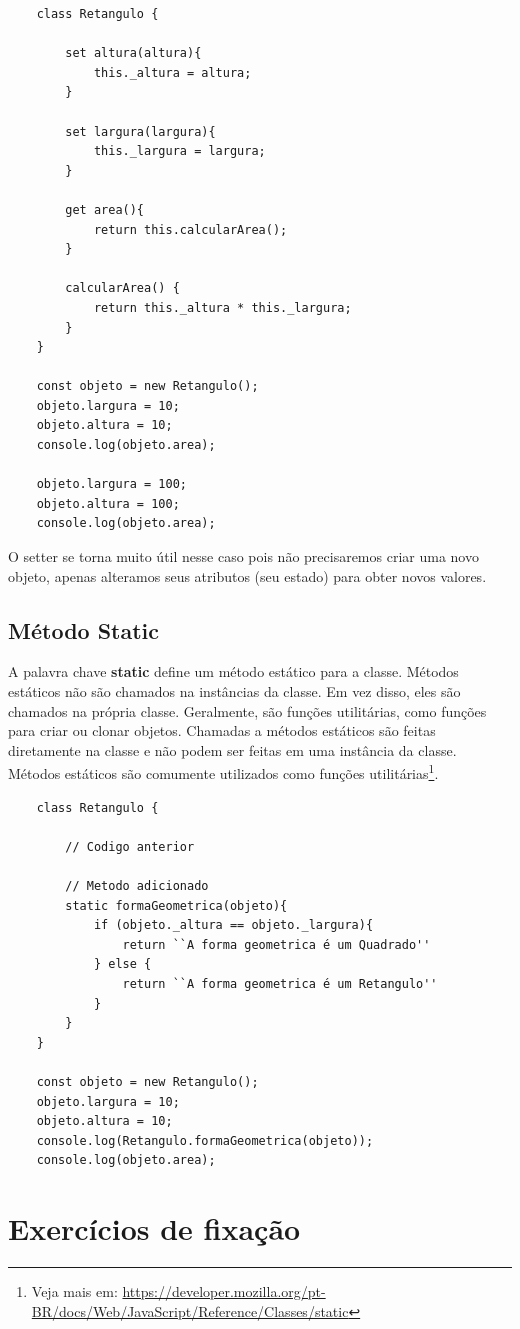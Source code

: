 \begin{lstlisting}
	class Retangulo {
		
		set altura(altura){
			this._altura = altura;
		}
		
		set largura(largura){
			this._largura = largura;
		}
		
		get area(){
			return this.calcularArea();
		}
		
		calcularArea() {
			return this._altura * this._largura;
		}
	}
	
	const objeto = new Retangulo();
	objeto.largura = 10;
	objeto.altura = 10;
	console.log(objeto.area);
	
	objeto.largura = 100;
	objeto.altura = 100;
	console.log(objeto.area);
\end{lstlisting}

O setter se torna muito útil nesse caso pois não precisaremos criar uma novo objeto, apenas alteramos seus atributos (seu estado) para obter novos valores.

\subsection{Método Static}

A palavra chave \textbf{static} define um método estático para a classe. Métodos estáticos não são chamados na instâncias da classe. Em vez disso, eles são chamados na própria classe. Geralmente, são funções utilitárias, como funções para criar ou clonar objetos. Chamadas a métodos estáticos são feitas diretamente na classe e não podem ser feitas em uma instância da classe. Métodos estáticos são comumente utilizados como funções utilitárias\footnote{Veja mais em: \url{https://developer.mozilla.org/pt-BR/docs/Web/JavaScript/Reference/Classes/static}}.

\begin{lstlisting}
	class Retangulo {
		
		// Codigo anterior
		
		// Metodo adicionado
		static formaGeometrica(objeto){
			if (objeto._altura == objeto._largura){
				return ``A forma geometrica é um Quadrado''
			} else {
				return ``A forma geometrica é um Retangulo''
			}
		}
	}
	
	const objeto = new Retangulo();
	objeto.largura = 10;
	objeto.altura = 10;
	console.log(Retangulo.formaGeometrica(objeto));
	console.log(objeto.area);
\end{lstlisting}

\section{Exercícios de fixação}

